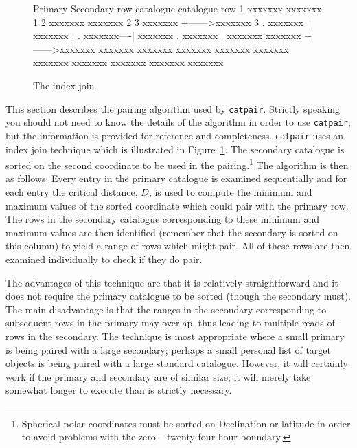 \documentclass[twoside,11pt]{starlink}
\begin{document}
\begin{figure}[htbp]

\begin{terminalv}
               Primary           Secondary
          row catalogue          catalogue row
           1   xxxxxxx            xxxxxxx   1
           2   xxxxxxx            xxxxxxx   2
           3   xxxxxxx    +------>xxxxxxx   3
           .   xxxxxxx    |       xxxxxxx   .
           .   xxxxxxx----|       xxxxxxx   .
               xxxxxxx    |       xxxxxxx
               xxxxxxx    +------>xxxxxxx
               xxxxxxx            xxxxxxx
               xxxxxxx            xxxxxxx
               xxxxxxx            xxxxxxx
                                  xxxxxxx
                                  xxxxxxx
                                  xxxxxxx
                                  xxxxxxx
\end{terminalv}

\caption{The index join \label{PAIR_INDEX_JOIN} }

\end{figure}

This section describes the pairing algorithm used by \texttt{catpair}.
Strictly speaking you should not need to know the details of the
algorithm in order to use \texttt{catpair}, but the information is
provided for reference and completeness. \texttt{catpair} uses an index join
technique which is illustrated in Figure~\ref{PAIR_INDEX_JOIN}. The
secondary catalogue is sorted on the second coordinate to be used in
the pairing.\footnote{Spherical-polar coordinates must be sorted on
Declination or latitude in order to avoid problems with the zero --
twenty-four hour boundary.} The algorithm is then as follows. Every
entry in the primary catalogue is examined sequentially and for each
entry the critical distance, $D$, is used to compute the minimum and
maximum values of the sorted coordinate which could pair with the
primary row. The rows in the secondary catalogue corresponding to these
minimum and maximum values are then identified (remember that the
secondary is sorted on this column) to yield a range of rows which might
pair. All of these rows are then examined individually to check if
they do pair.

The advantages of this technique are that it is relatively straightforward
and it does not require the primary catalogue to be sorted (though the
secondary must). The main disadvantage is that the ranges in the secondary
corresponding to subsequent rows in the primary may overlap, thus leading
to multiple reads of rows in the secondary. The technique is most
appropriate where a small primary is being paired with a large secondary;
perhaps a small personal list of target objects is being paired with a
large standard catalogue. However, it will certainly work if
the primary and secondary are of similar size; it will merely take
somewhat longer to execute than is strictly necessary.
\end{document}
